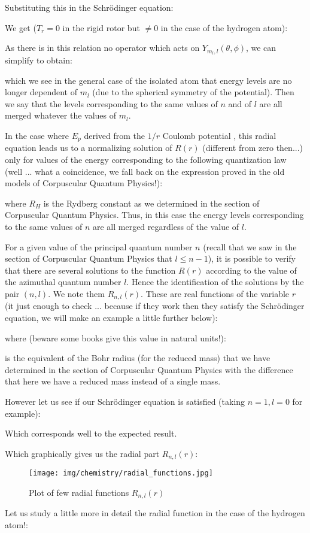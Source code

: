 	Substituting this in the Schrödinger equation:
	
	We get ($T_r=0$ in the rigid rotor but $\neq 0$ in the case of the hydrogen atom):
	
	As there is in this relation no operator which acts on $Y_{m_l,l}(\theta,\phi)$, we can simplify to obtain:
	
	which we see in the general case of the isolated atom that energy levels are no longer dependent of $m_l$ (due to the spherical symmetry of the potential). Then we say that the levels corresponding to the same values of $n$ and of $l$ are all merged whatever the values of $m_l$.
	
	In the case where $E_p$ derived from the $1 / r$ Coulomb potential , this radial equation leads us to a normalizing solution of $R (r)$ (different from zero then...) only for values of the energy corresponding to the following quantization law (well ... what a coincidence, we fall back on the expression proved in the old models of Corpuscular Quantum Physics!):
	
	where $R_H$ is the Rydberg constant as we determined in the section of Corpuscular Quantum Physics. Thus, in this case the energy levels corresponding to the same values of $n$ are all merged regardless of the value of $l$.

	For a given value of the principal quantum number $n$ (recall that we saw in the section of Corpuscular Quantum Physics that $l\leq n-1$), it is possible to verify that there are several solutions to the function $R(r)$ according to the value of the azimuthal quantum number $l$. Hence the identification of the solutions by the pair $(n, l)$. We note them $R_{n,l}(r)$. These are real functions of the variable $r$ (it just enough to check ... because if they work then they satisfy the Schrödinger equation, we will make an example a little further below):
	
	where (beware some books give this value in natural units!):
	
	is the equivalent of the Bohr radius (for the reduced mass) that we have determined in the section of Corpuscular Quantum Physics  with the difference that here we have a reduced mass instead of a single mass.
	
	However let us see if our Schrödinger equation is satisfied (taking $n=1,l=0$ for example):
	
	Which corresponds well to the expected result.

	Which graphically gives us the radial part $R_{n,l}(r)$:
	\begin{figure}[H]
		\centering
		\texttt{[image: img/chemistry/radial\_functions.jpg]}	
		\caption{Plot of few radial functions $R_{n,l}(r)$}
	\end{figure}
	Let us study a little more in detail the radial function in the case of the hydrogen atom!:

